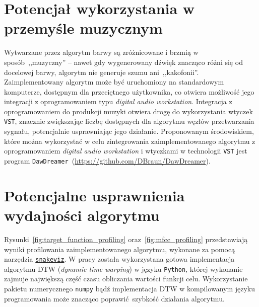 \section{Potencjał wykorzystania w przemyśle muzycznym}\label{sec:music_industry_usage}

Wytwarzane przez algorytm barwy są zróżnicowane i brzmią
w sposób~,,muzyczny'' -- nawet gdy wygenerowany dźwięk
znacząco różni się od docelowej barwy, algorytm nie generuje
szumu ani~,,kakofonii''. 
Zaimplementowany algorytm może być uruchomiony na standardowym komputerze,
dostępnym dla przeciętnego użytkownika, co otwiera możliwość jego integracji
z oprogramowaniem typu \textit{digital audio workstation}. Integracja
z oprogramowaniem do produkcji muzyki otwiera drogę do wykorzystania
wtyczek \texttt{VST}, znacznie zwiększając liczbę dostępnych
dla algorytmu węzłów przetwarzania sygnału, potencjalnie usprawniając
jego działanie. Proponowanym środowiskiem, które można wykorzystać w celu zintegrowania
zaimplementowanego algorytmu z oprogramowaniem \textit{digital audio workstation}
i wtyczkami w technologii \texttt{VST} jest program
\texttt{DawDreamer}~(\url{https://github.com/DBraun/DawDreamer}).


\section{Potencjalne usprawnienia wydajności algorytmu}

Rysunki~\ref{fig:target_function_profiling} oraz~\ref{fig:mfcc_profiling}
przedstawiają wyniki profilowania zaimplementowanego algorytmu, wykonane
za pomocą narzędzia \href{https://jiffyclub.github.io/snakeviz/}{\texttt{snakeviz}}.
W pracy została wykorzystana gotowa implementacja
algorytmu DTW (\textit{dynamic time warping}) w języku \texttt{Python}, której
wykonanie zajmuje największą część czasu obliczania wartości funkcji celu.
Wykorzystanie pakietu numerycznego \texttt{numpy} bądź implementacja DTW w
kompilowanym języku programowania może znacząco poprawić szybkość działania algorytmu.

